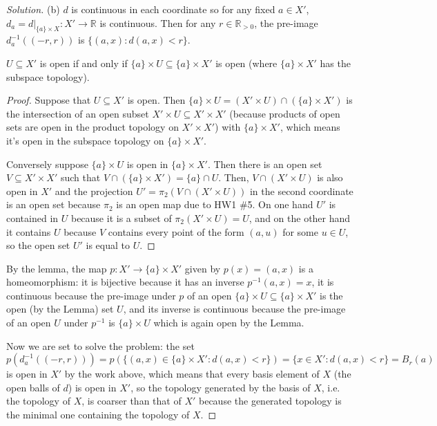 \documentclass[10pt]{article}
\providecommand{\RR}{\mathbb R}
\providecommand{\inv}{^{-1}}
\newenvironment{soln}{\begin{proof}[Solution]}{\end{proof}}
\begin{document}
\begin{soln}
    (b) $d$ is continuous in each coordinate
    so for any fixed $a\in X'$,
    $d_a = d|_{\{a\}\times X}\colon X'\to\RR$ is continuous.
    Then for any $r\in\RR_{>0}$, the pre-image $d_a\inv((-r,r))$ is
    $\{(a, x): d(a,x) < r\}$.

    \begin{lemma}
        \label{lem:embedding-X-in-X2}
	$U\subseteq X'$ is open if and only if $\{a\}\times U\subseteq \{a\}\times X'$
	is open (where $\{a\}\times X'$ has the subspace topology).
    \end{lemma}
    \begin{proof}
        Suppose that $U\subseteq X'$ is open.
	Then $\{a\}\times U = (X'\times U)\cap (\{a\}\times X')$
	is the intersection of an open subset $X'\times U\subseteq X'\times X'$
	(because products of open sets are open in the product topology
	on $X'\times X'$)
	with $\{a\}\times X'$, which means it's open in
	the subspace topology on $\{a\}\times X'$.

	Conversely suppose $\{a\}\times U$ is open in $\{a\}\times X'$.
	Then there is an open set $V\subseteq X'\times X'$
	such that $V\cap(\{a\}\times X') = \{a\}\cap U$.
	Then, $V\cap(X'\times U)$ is also open in $X'$
	and the projection $U' = \pi_2(V\cap(X'\times U))$ in the second coordinate
	is an open set because $\pi_2$ is an open map due to HW1 \#5.
	On one hand $U'$ is contained in $U$ because it is a subset of
	$\pi_2(X'\times U) = U$, and on the other hand it contains $U$
	because $V$ contains every point of the form $(a,u)$ for some $u\in U$,
	so the open set $U'$ is equal to $U$.
    \end{proof}
    By the lemma, the map $p\colon X'\to\{a\}\times X'$ given by $p(x) = (a,x)$
    is a homeomorphism: it is bijective because it has an inverse $p\inv(a,x) = x$,
    it is continuous because the pre-image under $p$ of an open
    $\{a\}\times U\subseteq\{a\}\times X'$ is the open (by the Lemma) set $U$,
    and its inverse is continuous because
    the pre-image of an open $U$ under $p\inv$ is $\{a\}\times U$
    which is again open by the Lemma.

    Now we are set to solve the problem: the set
    \begin{equation*}
	p(d_a\inv((-r,r))) = p(\{(a,x)\in\{a\}\times X' : d(a,x) < r\}) =
	\{x\in X' : d(a,x) < r\} = B_r(a)
    \end{equation*}
    is open in $X'$ by the work above, which means that
    every basis element of $X$ (the open balls of $d$) is open in $X'$,
    so the topology generated by the basis of $X$, i.e. the topology of $X$,
    is coarser than that of $X'$ because the generated topology
    is the minimal one containing the topology of $X$.
\end{soln}
\end{document}
